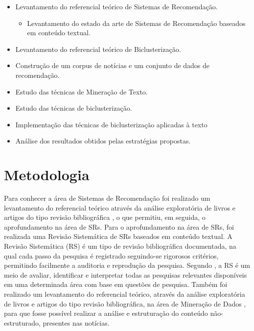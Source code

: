 \documentclass[normaltoc, espacoumemeio, pnumromarab,ruledheader]{abnt}
\begin{document}
\begin{itemize}
 \item Levantamento do referencial teórico de Sistemas de Recomendação.
 \begin{itemize}
  \item Levantamento do estado da arte de Sistemas de Recomendação baseados em conteúdo textual.
 \end{itemize}
 \item Levantamento do referencial teórico de Biclusterização.
 \item Construção de um corpus de notícias e um conjunto de dados de recomendação.
 \item Estudo das técnicas de Mineração de Texto.
 \item Estudo das técnicas de biclusterização.
 \item Implementação das técnicas de biclusterização aplicadas à texto
 \item Análise dos resultados obtidos pelas estratégias propostas.
\end{itemize}

\section{Metodologia}


Para conhecer a área de Sistemas de Recomendação foi realizado um levantamento do referencial teórico através da análise exploratória de livros e artigos do tipo revisão bibliográfica \cite{Adomavicius2005,Lops2011,Ricci2011,Ricci22011,Jannach2011,Burke2002}, o que permitiu, em seguida, o aprofundamento na área de SRs.
Para o aprofundamento na área de SRs, foi realizada uma Revisão Sistemática de SRs baseados em conteúdo textual.
A Revisão Sistemática (RS) é um tipo de revisão bibliográfica documentada, na qual cada passo da pesquisa é registrado seguindo-se rigorosos critérios, permitindo facilmente a auditoria e reprodução da pesquisa.
Segundo , a RS é um meio de avaliar, identificar e interpretar todas as pesquisas relevantes disponíveis em uma determinada área com base em questões de pesquisa.
Também foi realizado um levantamento do referencial teórico, através da análise exploratória de livros e artigos do tipo revisão bibliográfica, na área de Mineração de Dados \cite{Berry2010,Feldman2006,Miner2012,Hotho2005,Weiss2010}, para que fosse possível realizar a análise e estruturação do conteúdo não-estruturado, presentes nas notícias.
\end{document}
